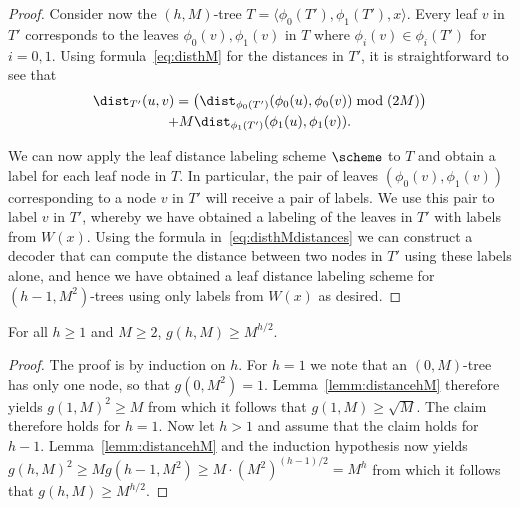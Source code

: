 \begin{proof}
Consider now the $(h,M)$-tree $T=\langle \phi_0(T'),\phi_1(T'),x\rangle$. Every leaf $v$ in $T'$ corresponds to the leaves $\phi_0(v),\phi_1(v)$ in $T$ where $\phi_i(v)\in \phi_i(T')$ for $i=0,1$. 
Using  formula~\eqref{eq:disthM} for the distances in $T'$, it is straightforward to see that
\begin{multline} \label{eq:disthMdistances}
\dist_{T'}(u,v) = \left(\dist_{\phi_0(T')}(\phi_0(u),\phi_0(v)) \bmod (2M)\right) \\
+ M\dist_{\phi_1(T')}(\phi_1(u),\phi_1(v)).
\end{multline}

We can now apply the leaf distance labeling scheme $\scheme$ to $T$ and obtain a label for each leaf node in $T$. In particular, the pair of leaves $(\phi_0(v),\phi_1(v))$ corresponding to a node $v$ in $T'$ will receive a pair of labels. We use this pair to label $v$ in $T'$, whereby we have obtained a labeling of the leaves in $T'$ with labels from $W(x)$. Using the formula in~\eqref{eq:disthMdistances} we can construct a decoder that can compute the distance between two nodes in $T'$ using these labels alone, and hence we have obtained a leaf distance labeling scheme for $(h-1,M^2)$-trees using only labels from $W(x)$ as desired.
\end{proof}

\begin{lemma} \label{lemm:distancehM2}
For all $h\geq 1$ and $M\geq 2$, $g(h,M)\geq M^{h/2}$.
\end{lemma}
\begin{proof}
The proof is by induction on $h$. For $h=1$ we note that an $(0,M)$-tree has only one node, so that $g(0,M^2)=1$. Lemma~\ref{lemm:distancehM} therefore yields $g(1,M)^2\geq M$ from which it follows that $g(1,M)\geq \sqrt{M}$. The claim therefore holds for $h=1$. Now let $h>1$ and assume that the claim holds for $h-1$. Lemma~\ref{lemm:distancehM} and the induction hypothesis now yields $g(h,M)^2\geq Mg(h-1,M^2)\geq M\cdot (M^2)^{(h-1)/2}=M^h$ from which it follows that $g(h,M)\geq M^{h/2}$.
\end{proof}

